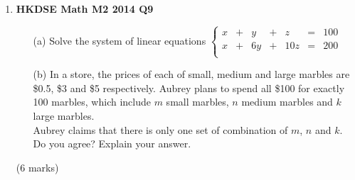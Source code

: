 \documentclass[12pt]{article}
\begin{document}
\begin{enumerate}
	\item \textbf{HKDSE Math M2 2014 Q9}
	\begin{enumerate}
		\item [(a)]Solve the system of linear equations $\left\{
		\begin{matrix}
			x & + & y & + & z & = & 100\\
			x & + & 6y& + &10z& = & 200\\
		\end{matrix}\right.$
		\item [(b)]In a store, the prices of each of small, medium and large marbles are \$0.5, \$3 and \$5 respectively. Aubrey plans to spend all \$100 for exactly 100 marbles, which include $m$ small marbles, $n$ medium marbles and $k$ large marbles.\\
		Aubrey claims that there is only one set of combination of $m$, $n$ and $k$. Do you agree? Explain your answer.
	\end{enumerate}
	(6 marks)


\end{enumerate}
\end{document}
